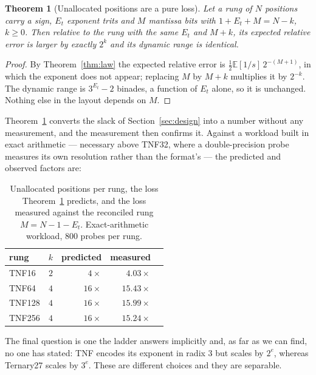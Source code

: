 \documentclass[11pt]{article}
\newtheorem{theorem}{Theorem}
\theoremstyle{definition}
\begin{document}
\begin{theorem}[Unallocated positions are a pure loss]
\label{thm:alloc}
Let a rung of $N$ positions carry a sign, $E_t$ exponent trits and $M$ mantissa
bits with $1 + E_t + M = N - k$, $k \geq 0$. Then relative to the rung with the
same $E_t$ and $M + k$, its expected relative error is larger by exactly $2^{k}$
and its dynamic range is identical.
\end{theorem}

\begin{proof}
By Theorem~\ref{thm:law} the expected relative error is
$\tfrac12 \mathbb{E}[1/s]\,2^{-(M+1)}$, in which the exponent does not appear;
replacing $M$ by $M+k$ multiplies it by $2^{-k}$. The dynamic range is
$3^{E_t}-2$ binades, a function of $E_t$ alone, so it is unchanged. Nothing else in
the layout depends on $M$.
\end{proof}

Theorem~\ref{thm:alloc} converts the slack of Section~\ref{sec:design} into a
number without any measurement, and the measurement then confirms it. Against a
workload built in exact arithmetic --- necessary above TNF32, where a
double-precision probe measures its own resolution rather than the format's ---
the predicted and observed factors are:

\begin{table}[t]\centering
\caption{Unallocated positions per rung, the loss Theorem~\ref{thm:alloc}
predicts, and the loss measured against the reconciled rung
$M = N - 1 - E_t$. Exact-arithmetic workload, 800 probes per rung.}
\label{tab:alloc}
\begin{tabular}{lrrrr}
\toprule
rung & $k$ & predicted & measured \\
\midrule
TNF16  & $2$ & $4\times$  & $4.03\times$  \\
TNF64  & $4$ & $16\times$ & $15.43\times$ \\
TNF128 & $4$ & $16\times$ & $15.99\times$ \\
TNF256 & $4$ & $16\times$ & $15.24\times$ \\
\bottomrule
\end{tabular}
\end{table}

The final question is one the ladder answers implicitly and, as far as we can
find, no one has stated: TNF encodes its exponent in radix 3 but scales by
$2^{e}$, whereas Ternary27 scales by $3^{e}$. These are different choices and
they are separable.
\end{document}
